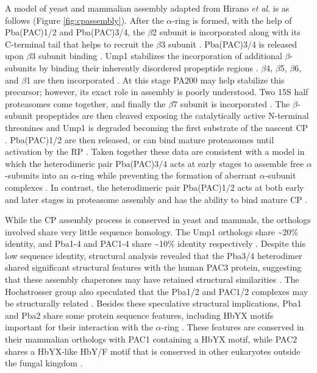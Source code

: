 	A model of yeast and mammalian assembly adapted from Hirano \textit{et al}. is as follows (Figure \ref{fig:cpassembly}).  After the $\alpha$-ring is formed, with the help of Pba(PAC)1/2 and Pba(PAC)3/4, the $\beta$2 subunit is incorporated along with its C-terminal tail that helps to recruit the $\beta$3 subunit \citep{hirano08}. Pba(PAC)3/4 is released upon $\beta$3 subunit binding \citep{hirano08}. Ump1 stabilizes the incorporation of additional $\beta$-subunits by binding their inherently disordered propeptide regions \citep{li07}. $\beta$4, $\beta$5, $\beta$6, and $\beta$1 are then incorporated \citep{hirano08}. At this stage PA200 may help stabilize this precursor; however, its exact role in assembly is poorly understood.  Two 15S half proteasomes come together, and finally the $\beta$7 subunit is incorporated \citep{hirano08}. The $\beta$-subunit propeptides are then cleaved exposing the catalytically active N-terminal threonines and Ump1 is degraded becoming the first substrate of the nascent CP \citep{li07}. Pba(PAC)1/2 are then released, or can bind mature proteasomes until activation by the RP \citep{hirano08}. Taken together these data are consistent with a model in which the heterodimeric pair Pba(PAC)3/4 acts at early stages to assemble free $\alpha$-subunits into an $\alpha$-ring while preventing the formation of aberrant $\alpha$-subunit complexes \citep{hirano08}. In contrast, the heterodimeric pair Pba(PAC)1/2 acts at both early and later stages in proteasome assembly and has the ability to bind mature CP \citep{wani16}.
	
	While the CP assembly process is conserved in yeast and mammals, the orthologs involved share very little sequence homology. The Ump1 orthologs share \textasciitilde{}20\% identity, and Pba1-4 and PAC1-4 share \textasciitilde{}10\% identity respectively \citep{murata09}. Despite this low sequence identity, structural analysis revealed that the Pba3/4 heterodimer shared significant structural features with the human PAC3 protein, suggesting that these assembly chaperones may have retained structural similarities \citep{yashiroda08}. The Hochstrosser group also speculated that the Pba1/2 and PAC1/2 complexes may be structurally related \citep{kusmierczyk11}. Besides these speculative structural implications, Pba1 and Pba2 share some protein sequence features, including HbYX motifs important for their interaction with the $\alpha$-ring \citep{kusmierczyk11}. These features are conserved in their mammalian orthologs with PAC1 containing a HbYX motif, while PAC2 shares a HbYX-like HbY/F motif that is conserved in other eukaryotes outside the fungal kingdom \citep{kusmierczyk11}.
	
